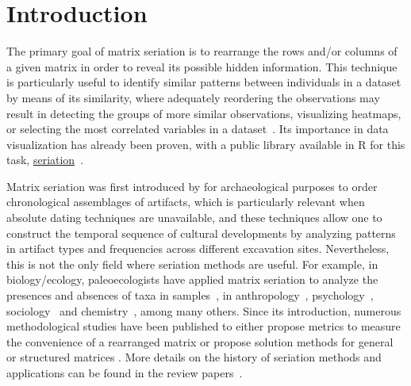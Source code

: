 \documentclass[a4paper,11pt, reqno]{amsart}
\begin{document}



 \section*{Introduction}

 The primary goal of matrix seriation is to rearrange the rows and/or columns of a given matrix in order to reveal its possible hidden information. This technique is particularly useful to identify similar patterns between individuals in a dataset by means of its similarity, where adequately reordering the observations may result in detecting the groups of more similar observations,  visualizing heatmaps, or selecting the most correlated variables in a dataset~\citep{bertin2011graphics}. Its importance in data visualization has already been proven, with a public library available in R for this task, \href{https://cran.r-project.org/web/packages/seriation/index.html}{seriation}~\citep{hahsler2008getting}.

Matrix seriation was first introduced by \cite{petrie1899sequences} for archaeological purposes to order chronological assemblages of artifacts, which is particularly relevant when absolute dating techniques are unavailable, and these techniques allow one to construct the temporal sequence of cultural developments by analyzing patterns in artifact types and frequencies across different excavation sites. Nevertheless, this is not the only field where seriation methods are useful. For example, in biology/ecology, paleoecologists have applied matrix seriation to analyze the presences and absences of taxa in samples~\citep{brower1988seriation}, in anthropology~\citep{kuzara1966seriation}, psychology~\citep{brusco2001compact}, sociology~\citep{forsyth1946matrix} and chemistry~\citep{toth2018seriation}, among many others. Since its introduction, numerous methodological studies have been published to either propose metrics to measure the convenience of a rearranged matrix or propose solution methods for general or structured matrices \citep[see e.g.][]{borst2024connectivity,gendreau1994generalized,laporte1976comparison,laporte1978seriation,laporte1987solving}. More details on the history of seriation methods and applications can be found in the review papers~\citep{liiv2010seriation,hahsler2008getting}.
\end{document}
